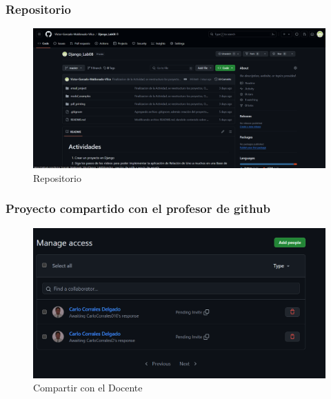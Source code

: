 \documentclass{article}
\begin{document}
	\subsubsection{Repositorio}
    \begin{figure}[H]
      \centering
      \includegraphics[width=1\textwidth, keepaspectratio]{img/repositorio.png}
      \caption{Repositorio}
    \end{figure}
  

	\subsubsection{Proyecto compartido con el profesor de github}
    \begin{figure}[H]
      \centering
      \includegraphics[width=1\textwidth, keepaspectratio]{img/Compartir.png}
      \caption{Compartir con el Docente}
    \end{figure}
  \newpage
  
\end{document}
